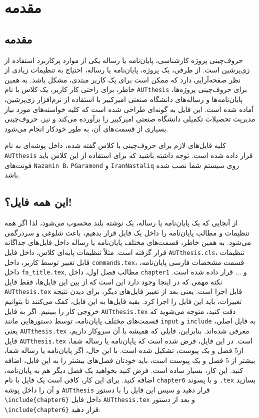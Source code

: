 \chapter{
	مقدمه
}

\section{مقدمه}
حروف‌چینی پروژه کارشناسی، پایان‌نامه یا رساله یکی از موارد پرکاربرد استفاده از زی‌پرشین است. از طرفی، یک پروژه، پایان‌نامه یا رساله،  احتیاج به تنظیمات زیادی از نظر صفحه‌آرایی  دارد که ممکن است برای
یک کاربر مبتدی، مشکل باشد. به همین خاطر، برای راحتی کار کاربر، یک کلاس با نام 
\verb;AUTthesis;
 برای حروف‌چینی پروژه‌ها، پایان‌نامه‌ها و رساله‌های دانشگاه صنعتی امیرکبیر با استفاده از نرم‌افزار زی‌پرشین،  آماده شده است. این فایل به 
گونه‌ای طراحی شده است که کلیه خواسته‌های مورد نیاز  مدیریت تحصیلات تکمیلی دانشگاه صنعتی امیرکبیر را برآورده می‌کند و نیز، حروف‌چینی بسیاری
از قسمت‌های آن، به طور خودکار انجام می‌شود.

کلیه فایل‌های لازم برای حروف‌چینی با کلاس گفته شده، داخل پوشه‌ای به نام
\verb;AUTthesis;
  قرار داده شده است. توجه داشته باشید که برای استفاده از این کلاس باید فونت‌های
  \verb;Nazanin B;،
 \verb;PGaramond;
 و
  \verb;IranNastaliq;
    روی سیستم شما نصب شده باشد.
\section{این همه فایل؟!}\label{sec2}
از آنجایی که یک پایان‌نامه یا رساله، یک نوشته بلند محسوب می‌شود، لذا اگر همه تنظیمات و مطالب پایان‌نامه را داخل یک فایل قرار بدهیم، باعث شلوغی
و سردرگمی می‌شود. به همین خاطر، قسمت‌های مختلف پایان‌نامه یا رساله  داخل فایل‌های جداگانه قرار گرفته است. مثلاً تنظیمات پایه‌ای کلاس، داخل فایل
\verb;AUTthesis.cls;، 
تنظیمات قابل تغییر توسط کاربر، داخل 
\verb;commands.tex;،
قسمت مشخصات فارسی پایان‌نامه، داخل 
\verb;fa_title.tex;,
مطالب فصل اول، داخل 
\verb;chapter1;
و ... قرار داده شده است. نکته مهمی که در اینجا وجود دارد این است که از بین این  فایل‌ها، فقط فایل 
\verb;AUTthesis.tex;
قابل اجرا است. یعنی بعد از تغییر فایل‌های دیگر، برای دیدن نتیجه تغییرات، باید این فایل را اجرا کرد. بقیه فایل‌ها به این فایل، کمک می‌کنند تا بتوانیم خروجی کار را ببینیم. اگر به فایل 
\verb;AUTthesis.tex;
دقت کنید، متوجه می‌شوید که قسمت‌های مختلف پایان‌نامه، توسط دستورهایی مانند 
\verb;input;
و
\verb;include;
به فایل اصلی، یعنی 
\verb;AUTthesis.tex;
معرفی شده‌اند. بنابراین، فایلی که همیشه با آن سروکار داریم، فایل 
\verb;AUTthesis.tex;
است.
در این فایل، فرض شده است که پایان‌نامه یا رساله شما، از5 فصل و یک پیوست، تشکیل شده است. با این حال، اگر
  پایان‌نامه یا رساله شما، بیشتر از 5 فصل و یک پیوست است، باید خودتان فصل‌های بیشتر را به این فایل، اضافه کنید. این کار، بسیار ساده است. فرض کنید بخواهید یک فصل دیگر هم به پایان‌نامه، اضافه کنید. برای این کار، کافی است یک فایل با نام 
\verb;chapter6;
و با پسوند 
\verb;.tex;
بسازید و آن را داخل پوشه 
\verb;AUTthesis;
قرار دهید و سپس این فایل را با دستور 
\texttt{\textbackslash include\{chapter6\}}
داخل فایل
\verb;AUTthesis.tex;
و بعد از دستور
\texttt{\textbackslash include\{chapter6\}}
 قرار دهید.

